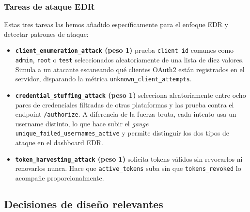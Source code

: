 \documentclass[12pt, a4paper]{article}
\begin{document}
			\subsubsection{Tareas de ataque EDR}
			Estas tres tareas las hemos añadido específicamente para el enfoque EDR y detectar patrones de ataque:
				\begin{itemize}
						\item \textbf{\texttt{client\_enumeration\_attack} (peso 1)} prueba \texttt{client\_id} comunes como \texttt{admin}, \texttt{root} o \texttt{test} seleccionados aleatoriamente de una lista de diez valores. Simula a un atacante escaneando qué clientes OAuth2 están registrados en el servidor, disparando la métrica	\texttt{unknown\_client\_attempts}.
						\item \textbf{\texttt{credential\_stuffing\_attack} (peso 1)} selecciona aleatoriamente entre ocho pares de credenciales filtradas de otras plataformas y las prueba contra el endpoint \texttt{/authorize}. A diferencia de la fuerza bruta, cada intento usa un username distinto, lo que hace subir el \textit{gauge} \texttt{unique\_failed\_usernames\_active} y permite distinguir los dos tipos de ataque en el dashboard EDR.
						\item \textbf{\texttt{token\_harvesting\_attack} (peso 1)} solicita tokens válidos sin revocarlos ni renovarlos nunca. Hace que \texttt{active\_tokens} suba sin que \texttt{tokens\_revoked} lo acompañe proporcionalmente.
				\end{itemize}
				
	
		
		\subsection{Decisiones de diseño relevantes}
		
\end{document}
